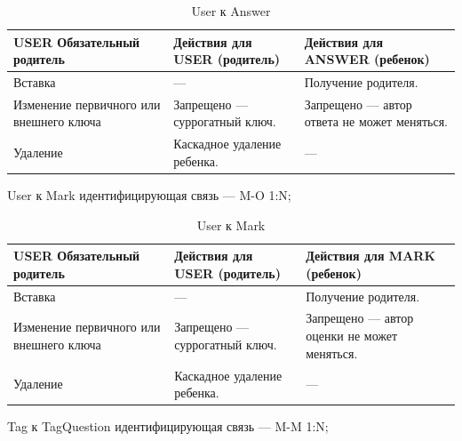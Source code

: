 \documentclass[a4paper, 14pt]{extarticle}
\begin{document}
\begin{table}[H]
\centering
\caption{User к Answer}
\setlength\extrarowheight{2pt} %
\begin{tabular}{|>{\centering\arraybackslash}m{4cm}|>{\RaggedRight\arraybackslash}m{6cm}|>{\RaggedRight\arraybackslash}m{6cm}|}
\hline
\textbf{USER Обязательный родитель} & \textbf{Действия для USER (родитель)} & \textbf{Действия для ANSWER (ребенок)} \\
\hline
Вставка & — & Получение родителя. \\
\hline
Изменение первичного или внешнего ключа & Запрещено — суррогатный ключ. & Запрещено — автор ответа не может меняться. \\
\hline
Удаление & Каскадное удаление ребенка. & — \\
\hline
\end{tabular}
\end{table}

\newpage

User к Mark идентифицирующая связь — M-O 1:N;

\begin{table}[H]
\centering
\caption{User к Mark}
\setlength\extrarowheight{2pt} %
\begin{tabular}{|>{\centering\arraybackslash}m{4cm}|>{\RaggedRight\arraybackslash}m{6cm}|>{\RaggedRight\arraybackslash}m{6cm}|}
\hline
\textbf{USER Обязательный родитель} & \textbf{Действия для USER (родитель)} & \textbf{Действия для MARK (ребенок)} \\
\hline
Вставка & — & Получение родителя. \\
\hline
Изменение первичного или внешнего ключа & Запрещено — суррогатный ключ. & Запрещено — автор оценки не может меняться. \\
\hline
Удаление & Каскадное удаление ребенка. & — \\
\hline
\end{tabular}
\end{table}

\newpage

Tag к TagQuestion идентифицирующая связь — M-M 1:N;
\end{document}
